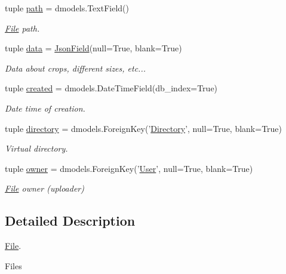 \begin{DoxyCompactItemize}
tuple \hyperlink{classcore_1_1models_1_1File_a5e8a1bacede61e2e1f2386907e63e274}{path} = dmodels.\-Text\-Field()
\begin{DoxyCompactList}\small\item\em \hyperlink{classcore_1_1models_1_1File}{File} path. \end{DoxyCompactList}\item 
tuple \hyperlink{classcore_1_1models_1_1File_a786c3b3f61bd0e38ea5d32310391a235}{data} = \hyperlink{classcore_1_1fields_1_1JsonField}{Json\-Field}(null=True, blank=True)
\begin{DoxyCompactList}\small\item\em Data about crops, different sizes, etc... \end{DoxyCompactList}\item 
tuple \hyperlink{classcore_1_1models_1_1File_adaa3cc04ed44b20d1796df296373e9ba}{created} = dmodels.\-Date\-Time\-Field(db\-\_\-index=True)
\begin{DoxyCompactList}\small\item\em Date time of creation. \end{DoxyCompactList}\item 
tuple \hyperlink{classcore_1_1models_1_1File_a65e05c5c5dee44c2c73d8a202845209f}{directory} = dmodels.\-Foreign\-Key('\hyperlink{classcore_1_1models_1_1Directory}{Directory}', null=True, blank=True)
\begin{DoxyCompactList}\small\item\em Virtual directory. \end{DoxyCompactList}\item 
tuple \hyperlink{classcore_1_1models_1_1File_a1925fe1551da140f13cb0295d3c250a3}{owner} = dmodels.\-Foreign\-Key('\hyperlink{classcore_1_1models_1_1User}{User}', null=True, blank=True)
\begin{DoxyCompactList}\small\item\em \hyperlink{classcore_1_1models_1_1File}{File} owner (uploader) \end{DoxyCompactList}\end{DoxyCompactItemize}


\subsection{Detailed Description}
\hyperlink{classcore_1_1models_1_1File}{File}. 

Files 

